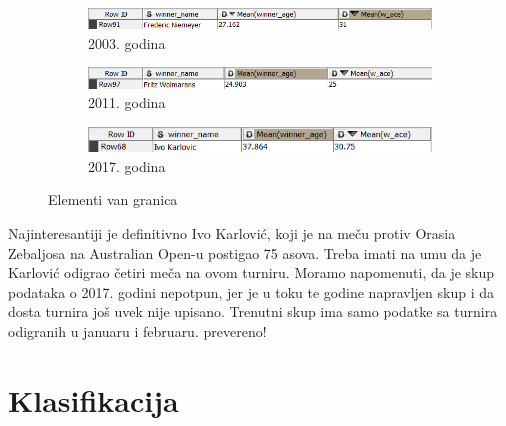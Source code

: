\documentclass[a4paper]{article}
\begin{document}
\begin{figure}[H]
	\begin{subfigure}[h]{\textwidth}
		\begin{center}
			\includegraphics[scale=0.80]{Klasterovanje/FredericNiemeyer2003Outlier.png}
		\end{center}
		\caption{2003. godina}
		\label{fig:Autlajer2003}
	\end{subfigure}
	
	\vspace{0.5cm}
	\begin{subfigure}[h]{\textwidth}
		\begin{center}
			\includegraphics[scale=0.80]{Klasterovanje/FritzWolmarans2011Outlier.png}
		\end{center}
		\caption{2011. godina}
		\label{fig:Autlajer2011}
	\end{subfigure}
	
	\vspace{0.5cm}
	\begin{subfigure}[h]{\textwidth}
		\begin{center}
			\includegraphics[scale=0.80]{Klasterovanje/IvoKarlovic2017Outlier.png}
		\end{center}
		\caption{2017. godina}
		\label{fig:Autlajer2011}
	\end{subfigure}
	
	\caption{Elementi van granica}
	\label{fig:IgraciAutlajeri}
\end{figure} 

Najinteresantiji je definitivno Ivo Karlović, koji je na meču protiv Orasia Zebaljosa na Australian Open-u postigao 75 asova. Treba imati na umu da je Karlović odigrao četiri meča na ovom turniru. Moramo napomenuti, da je skup podataka o 2017. godini nepotpun, jer je u toku te godine napravljen skup i da dosta turnira još uvek nije upisano. Trenutni skup ima samo podatke sa turnira odigranih u januaru i februaru. {\color{green} prevereno!}  


\section{Klasifikacija}
\end{document}
